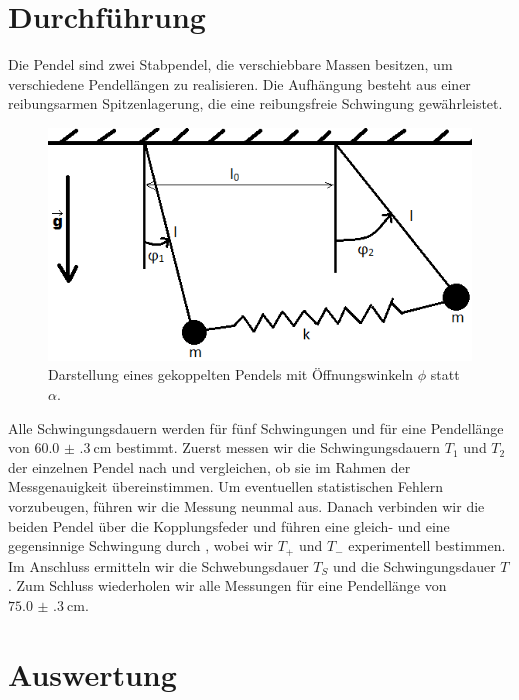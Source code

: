 \section{Durchführung}
Die Pendel sind zwei Stabpendel, die verschiebbare Massen besitzen, um verschiedene Pendellängen zu realisieren. Die
Aufhängung besteht aus einer reibungsarmen Spitzenlagerung, die eine reibungsfreie Schwingung gewährleistet.
\begin{figure}[h]
  \centering
  \includegraphics{gekoppelte_pendel2.png}
  \caption{Darstellung eines gekoppelten Pendels mit Öffnungswinkeln $\phi$ statt $\alpha$.}
  \label{fig:skizze1}
\end{figure}
Alle Schwingungsdauern werden für fünf Schwingungen und für eine Pendellänge von $\SI{60.0(3)}{\centi\metre}$ bestimmt. Zuerst messen wir die Schwingungsdauern $\textit{T}_{1}$
und $\textit{T}_{2}$ der einzelnen Pendel nach und vergleichen, ob sie im Rahmen der Messgenauigkeit übereinstimmen. Um eventuellen
statistischen Fehlern vorzubeugen, führen wir die Messung neunmal aus. Danach verbinden wir die beiden Pendel über die Kopplungsfeder und führen eine gleich-
und eine gegensinnige Schwingung durch , wobei wir $\textit{T}_{+}$ und $\textit{T}_{-}$ experimentell bestimmen. Im
Anschluss ermitteln wir die Schwebungsdauer $\textit{T}_{S}$ und die Schwingungsdauer $\textit{T}$. Zum Schluss wiederholen wir
alle Messungen für eine Pendellänge von $\SI{75.0(3)}{\centi\metre}$.
\section{Auswertung}
